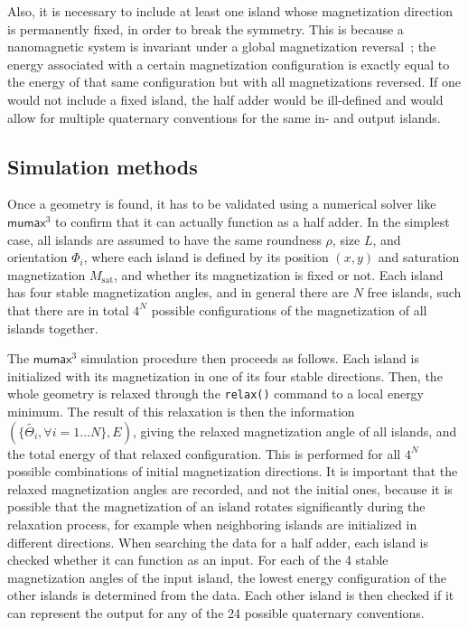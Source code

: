\documentclass[11pt,a4paper,english]{article}
\newcommand{\code}[1]{\texttt{#1}}
\newcommand{\mumax}{$\mathsf{mumax}^3$}
\begin{document}
Also, it is necessary to include at least one island whose magnetization direction is permanently fixed, in order to break the symmetry. This is because a nanomagnetic system is invariant under a global magnetization reversal~\cite{GYP-18}; the energy associated with a certain magnetization configuration is exactly equal to the energy of that same configuration but with all magnetizations reversed. If one would not include a fixed island, the half adder would be ill-defined and would allow for multiple quaternary conventions for the same in- and output islands. \par


\subsection{Simulation methods}
Once a geometry is found, it has to be validated using a numerical solver like \mumax{} to confirm that it can actually function as a half adder. In the simplest case, all islands are assumed to have the same roundness $\rho$, size $L$, and orientation $\Phi_i$, where each island is defined by its position $(x,y)$ and saturation magnetization $M_\mathrm{sat}$, and whether its magnetization is fixed or not. Each island has four stable magnetization angles, and in general there are $N$ free islands, such that there are in total $4^N$ possible configurations of the magnetization of all islands together. \par
The \mumax{} simulation procedure then proceeds as follows. Each island is initialized with its magnetization in one of its four stable directions. Then, the whole geometry is relaxed through the \code{relax()} command to a local energy minimum. The result of this relaxation is then the information $(\{\widetilde{\Theta_i}, \forall i=1\dots N\}, E)$, giving the relaxed magnetization angle of all islands, and the total energy of that relaxed configuration. This is performed for all $4^N$ possible combinations of initial magnetization directions. It is important that the relaxed magnetization angles are recorded, and not the initial ones, because it is possible that the magnetization of an island rotates significantly during the relaxation process, for example when neighboring islands are initialized in different directions. When searching the data for a half adder, each island is checked whether it can function as an input. For each of the 4 stable magnetization angles of the input island, the lowest energy configuration of the other islands is determined from the data. Each other island is then checked if it can represent the output for any of the 24 possible quaternary conventions. \par
\end{document}
